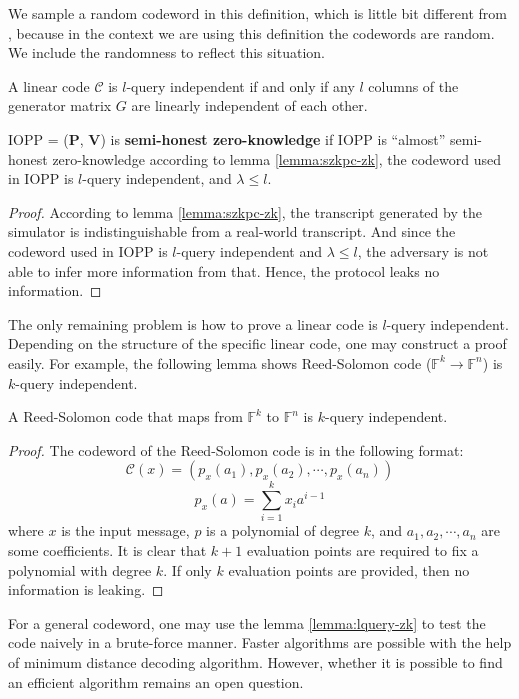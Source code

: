 We sample a random codeword in this definition, which is little bit different from \cite{BCL22}, because in the context we are using this definition the codewords are random. We include the randomness to reflect this situation.

\begin{lemma}
\label{lemma:lquery-zk}

A linear code $\mathcal{C}$ is $l$-query independent if and only if any $l$ columns of the generator matrix $G$ are linearly independent of each other.

\end{lemma}

\begin{lemma}
\label{lemma:szkpc-zk-final}

IOPP = ($\textbf{P}$, $\textbf{V}$) is \textbf{semi-honest zero-knowledge} if IOPP is ``almost'' semi-honest zero-knowledge according to lemma \ref{lemma:szkpc-zk}, the codeword used in IOPP is $l$-query independent, and $\lambda \le l$.

\end{lemma}
\begin{proof}

According to lemma \ref{lemma:szkpc-zk}, the transcript generated by the simulator is indistinguishable from a real-world transcript. And since the codeword used in IOPP is $l$-query independent and $\lambda \le l$, the adversary is not able to infer more information from that. Hence, the protocol leaks no information.

\end{proof}

The only remaining problem is how to prove a linear code is $l$-query independent. Depending on the structure of the specific linear code, one may construct a proof easily. For example, the following lemma shows Reed-Solomon code ($\mathbb{F}^k \rightarrow \mathbb{F}^n$) is $k$-query independent.

\begin{lemma}
\label{lemma:rscode-kzk}

A Reed-Solomon code that maps from $\mathbb{F}^k$ to $\mathbb{F}^n$ is $k$-query independent.

\end{lemma}
\begin{proof}

The codeword of the Reed-Solomon code is in the following format:
$$
\mathcal{C}(x) = 
(
p_x(a_1), p_x(a_2), \cdots, p_x(a_n)
)
$$
$$
p_x(a) = \sum_{i=1}^k x_i a^{i-1}
$$
where $x$ is the input message, $p$ is a polynomial of degree $k$, and $a_1, a_2, \cdots, a_n$ are some coefficients.
It is clear that $k+1$ evaluation points are required to fix a polynomial with degree $k$. If only $k$ evaluation points are provided, then no information is leaking.

\end{proof}

For a general codeword, one may use the lemma \ref{lemma:lquery-zk} to test the code naively in a brute-force manner. Faster algorithms are possible with the help of minimum distance decoding algorithm. However, whether it is possible to find an efficient algorithm remains an open question.